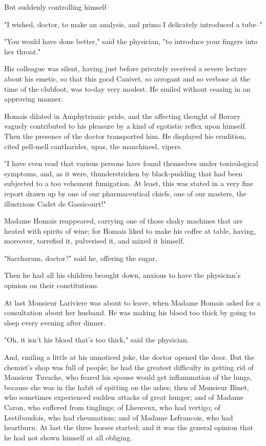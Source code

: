 \documentclass{tufte-book}
\begin{document}
But suddenly controlling himself--

"I wished, doctor, to make an analysis, and primo I delicately
introduced a tube--"

"You would have done better," said the physician, "to introduce your
fingers into her throat."

His colleague was silent, having just before privately received a severe
lecture about his emetic, so that this good Canivet, so arrogant and so
verbose at the time of the clubfoot, was to-day very modest. He smiled
without ceasing in an approving manner.

Homais dilated in Amphytrionic pride, and the affecting thought of
Bovary vaguely contributed to his pleasure by a kind of egotistic
reflex upon himself. Then the presence of the doctor transported him.
He displayed his erudition, cited pell-mell cantharides, upas, the
manchineel, vipers.

"I have even read that various persons have found themselves
under toxicological symptoms, and, as it were, thunderstricken by
black-pudding that had been subjected to a too vehement fumigation.
At least, this was stated in a very fine report drawn up by one of our
pharmaceutical chiefs, one of our masters, the illustrious Cadet de
Gassicourt!"

Madame Homais reappeared, carrying one of those shaky machines that
are heated with spirits of wine; for Homais liked to make his coffee
at table, having, moreover, torrefied it, pulverised it, and mixed it
himself.

"Saccharum, doctor?" said he, offering the sugar.

Then he had all his children brought down, anxious to have the
physician's opinion on their constitutions.

At last Monsieur Lariviere was about to leave, when Madame Homais asked
for a consultation about her husband. He was making his blood too thick
by going to sleep every evening after dinner.

"Oh, it isn't his blood that's too thick," said the physician.

And, smiling a little at his unnoticed joke, the doctor opened the
door. But the chemist's shop was full of people; he had the greatest
difficulty in getting rid of Monsieur Tuvache, who feared his spouse
would get inflammation of the lungs, because she was in the habit of
spitting on the ashes; then of Monsieur Binet, who sometimes experienced
sudden attacks of great hunger; and of Madame Caron, who suffered
from tinglings; of Lheureux, who had vertigo; of Lestiboudois, who had
rheumatism; and of Madame Lefrancois, who had heartburn. At last the
three horses started; and it was the general opinion that he had not
shown himself at all obliging.
\end{document}
